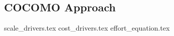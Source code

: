 \subsection{COCOMO Approach} %
\label{sec:cocomo_approach}
\impor
{scale_drivers.tex}
{cost_drivers.tex}
{effort_equation.tex}

